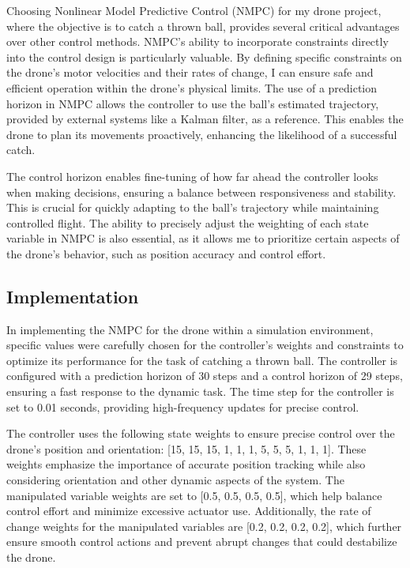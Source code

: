 \documentclass{UoNMCHA}
\numberwithin{equation}{section}
\begin{document}
Choosing Nonlinear Model Predictive Control (NMPC) for my drone project, where the objective is to catch a thrown ball, provides several critical advantages over other control methods. NMPC's ability to incorporate constraints directly into the control design is particularly valuable. By defining specific constraints on the drone's motor velocities and their rates of change, I can ensure safe and efficient operation within the drone's physical limits. The use of a prediction horizon in NMPC allows the controller to use the ball's estimated trajectory, provided by external systems like a Kalman filter, as a reference. This enables the drone to plan its movements proactively, enhancing the likelihood of a successful catch.

The control horizon enables fine-tuning of how far ahead the controller looks when making decisions, ensuring a balance between responsiveness and stability. This is crucial for quickly adapting to the ball's trajectory while maintaining controlled flight. The ability to precisely adjust the weighting of each state variable in NMPC is also essential, as it allows me to prioritize certain aspects of the drone's behavior, such as position accuracy and control effort.

\subsection{Implementation}

In implementing the NMPC for the drone within a simulation environment, specific values were carefully chosen for the controller's weights and constraints to optimize its performance for the task of catching a thrown ball. The controller is configured with a prediction horizon of 30 steps and a control horizon of 29 steps, ensuring a fast response to the dynamic task. The time step for the controller is set to 0.01 seconds, providing high-frequency updates for precise control.

The controller uses the following state weights to ensure precise control over the drone's position and orientation: [15, 15, 15, 1, 1, 1, 5, 5, 5, 1, 1, 1]. These weights emphasize the importance of accurate position tracking while also considering orientation and other dynamic aspects of the system. The manipulated variable weights are set to [0.5, 0.5, 0.5, 0.5], which help balance control effort and minimize excessive actuator use. Additionally, the rate of change weights for the manipulated variables are [0.2, 0.2, 0.2, 0.2], which further ensure smooth control actions and prevent abrupt changes that could destabilize the drone.
\end{document}
